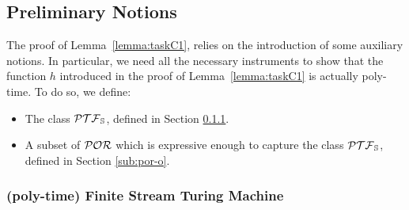 \subsection{Preliminary Notions}\label{sec:preliminary}
The proof of Lemma~\ref{lemma:taskC1},
relies on the introduction of some auxiliary notions.
In particular, we need all the necessary instruments to
show that the function $h$ introduced in the
proof of Lemma~\ref{lemma:taskC1} is actually poly-time.
%
To do so, we define:

\begin{itemize}
\item The class $\mathcal{PTF}_{\mathbb{S}}$, defined in Section \ref{sec:poly-timeTM}.
\item A subset of $\mathcal{POR}$ which is expressive enough to capture the class $\mathcal{PTF}_{\mathbb{S}}$,
 defined in Section \ref{sub:por-o}.
\end{itemize}
%









\subsubsection{(poly-time) Finite Stream Turing Machine}\label{sec:poly-timeTM}


